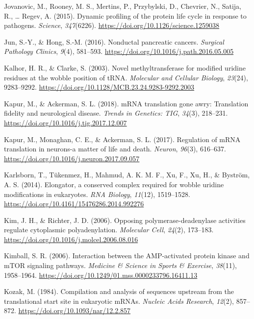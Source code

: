 \documentclass[12pt,openany]{book}
\begin{document}
\hypertarget{ref-Jovanovic2015}{}
Jovanovic, M., Rooney, M. S., Mertins, P., Przybylski, D., Chevrier, N.,
Satija, R., \ldots{} Regev, A. (2015). Dynamic profiling of the protein
life cycle in response to pathogens. \emph{Science}, \emph{347}(6226).
\url{https://doi.org/10.1126/science.1259038}

\hypertarget{ref-Jun2016}{}
Jun, S.-Y., \& Hong, S.-M. (2016). Nonductal pancreatic cancers.
\emph{Surgical Pathology Clinics}, \emph{9}(4), 581--593.
\url{https://doi.org/10.1016/j.path.2016.05.005}

\hypertarget{ref-Kalhor2003}{}
Kalhor, H. R., \& Clarke, S. (2003). Novel methyltransferase for
modified uridine residues at the wobble position of tRNA.
\emph{Molecular and Cellular Biology}, \emph{23}(24), 9283--9292.
\url{https://doi.org/10.1128/MCB.23.24.9283-9292.2003}

\hypertarget{ref-Kapur2018}{}
Kapur, M., \& Ackerman, S. L. (2018). mRNA translation gone awry:
Translation fidelity and neurological disease. \emph{Trends in Genetics:
TIG}, \emph{34}(3), 218--231.
\url{https://doi.org/10.1016/j.tig.2017.12.007}

\hypertarget{ref-Kapur2017}{}
Kapur, M., Monaghan, C. E., \& Ackerman, S. L. (2017). Regulation of
mRNA translation in neurons-a matter of life and death. \emph{Neuron},
\emph{96}(3), 616--637.
\url{https://doi.org/10.1016/j.neuron.2017.09.057}

\hypertarget{ref-Karlsborn2014}{}
Karlsborn, T., Tükenmez, H., Mahmud, A. K. M. F., Xu, F., Xu, H., \&
Byström, A. S. (2014). Elongator, a conserved complex required for
wobble uridine modifications in eukaryotes. \emph{RNA Biology},
\emph{11}(12), 1519--1528.
\url{https://doi.org/10.4161/15476286.2014.992276}

\hypertarget{ref-Kim2006}{}
Kim, J. H., \& Richter, J. D. (2006). Opposing polymerase-deadenylase
activities regulate cytoplasmic polyadenylation. \emph{Molecular Cell},
\emph{24}(2), 173--183.
\url{https://doi.org/10.1016/j.molcel.2006.08.016}

\hypertarget{ref-Kimball2006}{}
Kimball, S. R. (2006). Interaction between the AMP-activated protein
kinase and mTOR signaling pathways. \emph{Medicine \& Science in Sports
\& Exercise}, \emph{38}(11), 1958--1964.
\url{https://doi.org/10.1249/01.mss.0000233796.16411.13}

\hypertarget{ref-Kozak1984}{}
Kozak, M. (1984). Compilation and analysis of sequences upstream from
the translational start site in eukaryotic mRNAs. \emph{Nucleic Acids
Research}, \emph{12}(2), 857--872.
\url{https://doi.org/10.1093/nar/12.2.857}
\end{document}
